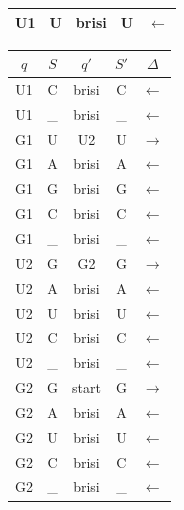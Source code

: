 \documentclass{article}
\begin{document}
\begin{center}
\begin{tabular}{| c | c || c | c | c |}
        U1 & U & brisi & U & $\leftarrow$  \\ \hline
    \end{tabular}
    \quad
    \begin{tabular}{| c | c || c | c | c |}
        \hline
        $q$ & $S$ & $q'$ & $S'$ & $\Delta$   \\  \hline
        U1 & C & brisi & C & $\leftarrow$  \\ \hline
        U1 & \_ & brisi & \_ & $\leftarrow$  \\ \hline
        G1 & U & U2 & U & $\rightarrow$  \\ \hline
        G1 & A & brisi & A & $\leftarrow$  \\ \hline
        G1 & G & brisi & G & $\leftarrow$  \\ \hline
        G1 & C & brisi & C & $\leftarrow$  \\ \hline
        G1 & \_ & brisi & \_ & $\leftarrow$  \\ \hline
        U2 & G & G2 & G & $\rightarrow$  \\ \hline
        U2 & A & brisi & A & $\leftarrow$  \\ \hline
        U2 & U & brisi & U & $\leftarrow$  \\ \hline
        U2 & C & brisi & C & $\leftarrow$  \\ \hline
        U2 & \_ & brisi & \_ & $\leftarrow$  \\ \hline
        G2 & G & start & G & $\rightarrow$  \\ \hline
        G2 & A & brisi & A & $\leftarrow$  \\ \hline
        G2 & U & brisi & U & $\leftarrow$  \\ \hline
        G2 & C & brisi & C & $\leftarrow$  \\ \hline
        G2 & \_ & brisi & \_ & $\leftarrow$  \\ \hline
    \end{tabular}
\end{center}
\end{document}
